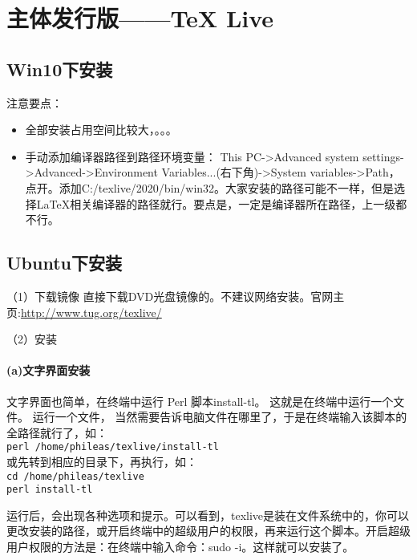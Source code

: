 \section{主体发行版——\TeX{} Live }
\subsection{Win10下安装}
注意要点：
\begin{itemize}
\item 全部安装占用空间比较大，。。。
\item 手动添加编译器路径到路径环境变量：
This PC->Advanced system settings->Advanced->Environment Variables...(右下角)->System variables->Path，点开。添加C:/texlive/2020/bin/win32。大家安装的路径可能不一样，但是选择\LaTeX{}相关编译器的路径就行。要点是，一定是编译器所在路径，上一级都不行。
\end{itemize}



\subsection{Ubuntu下安装}
（1）下载镜像
直接下载DVD光盘镜像的。不建议网络安装。官网主页:\url{http://www.tug.org/texlive/}


（2）安装
\paragraph{(a)文字界面安装}
文字界面也简单，在终端中运行 Perl 脚本install-tl。 这就是在终端中运行一个文件。 运行一个文件， 当然需要告诉电脑文件在哪里了，于是在终端输入该脚本的全路径就行了，如：\\
\verb*|perl /home/phileas/texlive/install-tl|\\
或先转到相应的目录下，再执行，如：\\
\verb*|cd /home/phileas/texlive|\\
\verb*|perl install-tl|

运行后，会出现各种选项和提示。可以看到，texlive是装在文件系统中的，你可以更改安装的路径，或开启终端中的超级用户的权限，再来运行这个脚本。开启超级用户权限的方法是：在终端中输入命令：sudo -i。这样就可以安装了。


